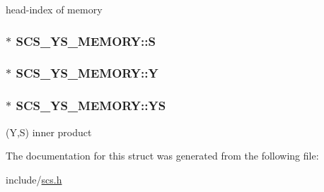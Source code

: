 head-\/index of memory \hypertarget{struct_s_c_s___y_s___m_e_m_o_r_y_a985ff0542e93c793746e489ec75478a8}{
\subsubsection[{S}]{$\ast$ S\-C\-S\-\_\-\-Y\-S\-\_\-\-M\-E\-M\-O\-R\-Y\-::\-S}}\label{struct_s_c_s___y_s___m_e_m_o_r_y_a985ff0542e93c793746e489ec75478a8}
\hypertarget{struct_s_c_s___y_s___m_e_m_o_r_y_a1f51e04778d5a79f30f57f9ff98014d6}{
\subsubsection[{Y}]{$\ast$ S\-C\-S\-\_\-\-Y\-S\-\_\-\-M\-E\-M\-O\-R\-Y\-::\-Y}}\label{struct_s_c_s___y_s___m_e_m_o_r_y_a1f51e04778d5a79f30f57f9ff98014d6}
\hypertarget{struct_s_c_s___y_s___m_e_m_o_r_y_af1caeb11b2846ee6b77e7ae30e641ed3}{
\subsubsection[{Y\-S}]{$\ast$ S\-C\-S\-\_\-\-Y\-S\-\_\-\-M\-E\-M\-O\-R\-Y\-::\-Y\-S}}\label{struct_s_c_s___y_s___m_e_m_o_r_y_af1caeb11b2846ee6b77e7ae30e641ed3}
(Y,S) inner product 

The documentation for this struct was generated from the following file\-:\begin{DoxyCompactItemize}
\item 
include/\hyperlink{scs_8h}{scs.\-h}\end{DoxyCompactItemize}
